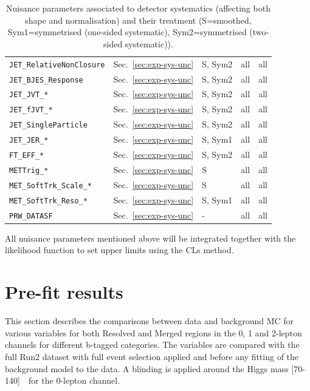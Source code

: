 \begin{table}[H]
\begin{tabular}{|p{3.5cm}|p{2.0cm}|p{1.5cm}|p{2cm}|p{1.5cm}|}
        \texttt{JET\_RelativeNonClosure} & Sec.~\ref{sec:exp-sys-unc} & S, Sym2 & all & all \\
        \texttt{JET\_BJES\_Response} & Sec.~\ref{sec:exp-sys-unc} & S, Sym2 & all & all \\
        \texttt{JET\_JVT\_*} & Sec.~\ref{sec:exp-sys-unc} & S, Sym2 & all & all \\
        \texttt{JET\_fJVT\_*} & Sec.~\ref{sec:exp-sys-unc} & S, Sym2 & all & all \\
        \texttt{JET\_SingleParticle} & Sec.~\ref{sec:exp-sys-unc} & S, Sym2 & all & all \\
        \texttt{JET\_JER\_*} & Sec.~\ref{sec:exp-sys-unc} & S, Sym1 & all & all \\
        \texttt{FT\_EFF\_*} & Sec.~\ref{sec:exp-sys-unc} & S, Sym2 & all & all \\
        \texttt{METTrig\_*} & Sec.~\ref{sec:exp-sys-unc} & S & all & all \\
        \texttt{MET\_SoftTrk\_Scale\_*} & Sec.~\ref{sec:exp-sys-unc} & S & all & all \\
        \texttt{MET\_SoftTrk\_Reso\_*} & Sec.~\ref{sec:exp-sys-unc} & S, Sym1 & all & all \\
        \texttt{PRW\_DATASF} & Sec.~\ref{sec:exp-sys-unc} & - & all & all \\
        \hline
    \end{tabular}
    \caption{Nuisance parameters associated to detector systematics (affecting both shape and normalisation) and their treatment (S=smoothed, Sym1=symmetrised (one-sided systematic), Sym2=symmetrised (two-sided systematic)).}
    \label{tab:np-shape2}
\end{table}  

\par All nuisance parameters mentioned above will be integrated together with the likelihood function to set upper limits using the CLs method.

\section{Pre-fit results}

\par This section describes the comparisons between data and background MC for various variables for both
Resolved and Merged regions in the 0, 1 and 2-lepton channels for different b-tagged categories. The variables are
compared with the full Run2 dataset with full event selection applied and before any fitting of the background
model to the data. A blinding is applied around the Higgs mass [70-140]~\GeV~for the 0-lepton channel.

